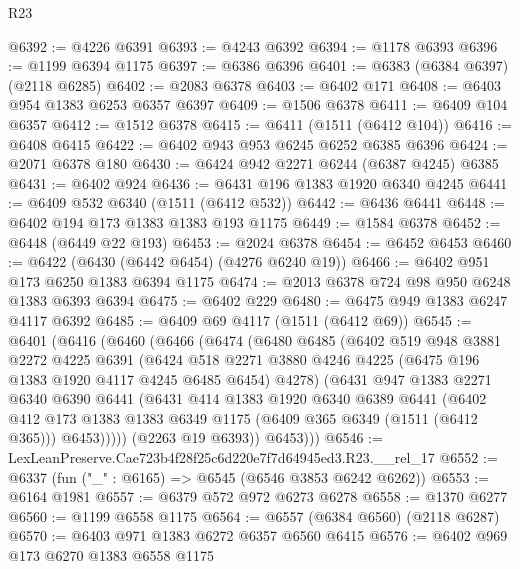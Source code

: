\begin{lexlean}{R23}
\begin{coremodule}
@6392 := @4226 @6391
@6393 := @4243 @6392
@6394 := @1178 @6393
@6396 := @1199 @6394 @1175
@6397 := @6386 @6396
@6401 := @6383 (@6384 @6397) (@2118 @6285)
@6402 := @2083 @6378
@6403 := @6402 @171
@6408 := @6403 @954 @1383 @6253 @6357 @6397
@6409 := @1506 @6378
@6411 := @6409 @104 @6357
@6412 := @1512 @6378
@6415 := @6411 (@1511 (@6412 @104))
@6416 := @6408 @6415
@6422 := @6402 @943 @953 @6245 @6252 @6385 @6396
@6424 := @2071 @6378 @180
@6430 := @6424 @942 @2271 @6244 (@6387 @4245) @6385
@6431 := @6402 @924
@6436 := @6431 @196 @1383 @1920 @6340 @4245
@6441 := @6409 @532 @6340 (@1511 (@6412 @532))
@6442 := @6436 @6441
@6448 := @6402 @194 @173 @1383 @1383 @193 @1175
@6449 := @1584 @6378
@6452 := @6448 (@6449 @22 @193)
@6453 := @2024 @6378
@6454 := @6452 @6453
@6460 := @6422 (@6430 (@6442 @6454) (@4276 @6240 @19))
@6466 := @6402 @951 @173 @6250 @1383 @6394 @1175
@6474 := @2013 @6378 @724 @98 @950 @6248 @1383 @6393 @6394
@6475 := @6402 @229
@6480 := @6475 @949 @1383 @6247 @4117 @6392
@6485 := @6409 @69 @4117 (@1511 (@6412 @69))
@6545 := @6401
    (@6416
      (@6460
        (@6466
          (@6474
            (@6480
              @6485
              (@6402
                @519
                @948
                @3881
                @2272
                @4225
                @6391
                (@6424
                  @518
                  @2271
                  @3880
                  @4246
                  @4225
                  (@6475 @196 @1383 @1920 @4117 @4245 @6485 @6454)
                  @4278)
                (@6431
                  @947
                  @1383
                  @2271
                  @6340
                  @6390
                  @6441
                  (@6431
                    @414
                    @1383
                    @1920
                    @6340
                    @6389
                    @6441
                    (@6402
                      @412
                      @173
                      @1383
                      @1383
                      @6349
                      @1175
                      (@6409 @365 @6349 (@1511 (@6412 @365)))
                      @6453)))))
            (@2263 @19 @6393))
          @6453)))
@6546 := LexLeanPreserve.Cae723b4f28f25c6d220e7f7d64945ed3.R23.__rel_17
@6552 := @6337 (fun ("_" : @6165) => @6545 (@6546 @3853 @6242 @6262))
@6553 := @6164 @1981
@6557 := @6379 @572 @972 @6273 @6278
@6558 := @1370 @6277
@6560 := @1199 @6558 @1175
@6564 := @6557 (@6384 @6560) (@2118 @6287)
@6570 := @6403 @971 @1383 @6272 @6357 @6560 @6415
@6576 := @6402 @969 @173 @6270 @1383 @6558 @1175

\end{coremodule}
\end{lexlean}
